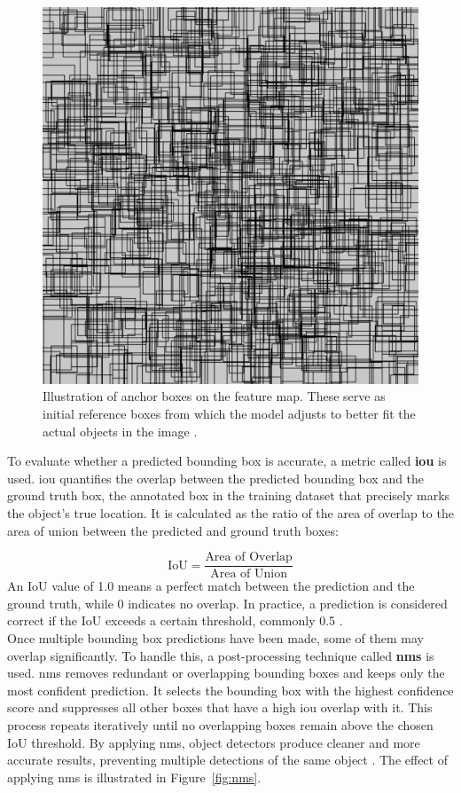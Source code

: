 \begin{figure}[h!]
    \centering
    \includegraphics[width=0.7\linewidth]{figures/theory/image-recognition/anchor-boxes.png}
    \caption[Anchor boxes in object detection]{Illustration of anchor boxes on the feature map. These serve as initial reference boxes from which the model adjusts to better fit the actual objects in the image \cite{thinkautonomous:anchorboxes}.}
    \label{fig:anchor-box}
\end{figure}

To evaluate whether a predicted bounding box is accurate, a metric called \textbf{\gls{iou}} is used. \gls{iou} quantifies the overlap between the predicted bounding box and the ground truth box, the annotated box in the training dataset that precisely marks the object's true location. It is calculated as the ratio of the area of overlap to the area of union between the predicted and ground truth boxes:

\[
\text{IoU} = \frac{\text{Area of Overlap}}{\text{Area of Union}}
\]
An IoU value of 1.0 means a perfect match between the prediction and the ground truth, while 0 indicates no overlap. In practice, a prediction is considered correct if the IoU exceeds a certain threshold, commonly 0.5 \cite{ultralytics:iou}. \\

 Once multiple bounding box predictions have been made, some of them may overlap significantly. To handle this, a post-processing technique called \textbf{\gls{nms}} is used. \gls{nms} removes redundant or overlapping bounding boxes and keeps only the most confident prediction. It selects the bounding box with the highest confidence score and suppresses all other boxes that have a high \gls{iou} overlap with it. This process repeats iteratively until no overlapping boxes remain above the chosen IoU threshold. By applying \gls{nms}, object detectors produce cleaner and more accurate results, preventing multiple detections of the same object
\cite{thepythoncode:nms}. The effect of applying \gls{nms} is illustrated in Figure~\ref{fig:nms}.

